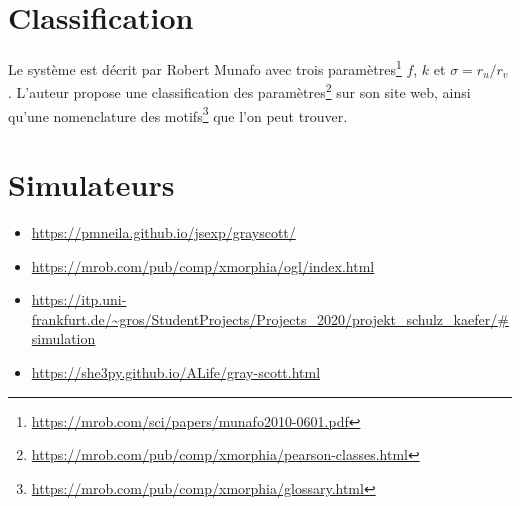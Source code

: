 \documentclass[11pt]{scrartcl}
\begin{document}
    \section{Classification}\label{sec:classification}

        Le système est décrit par Robert Munafo avec trois paramètres\footnote{\url{https://mrob.com/sci/papers/munafo2010-0601.pdf}}
        $f$, $k$ et $\sigma = r_u / r_v$.
        L'auteur propose une classification des paramètres\footnote{\url{https://mrob.com/pub/comp/xmorphia/pearson-classes.html}}
        sur son site web, ainsi qu'une nomenclature des motifs\footnote{\url{https://mrob.com/pub/comp/xmorphia/glossary.html}} que l'on
        peut trouver.

    \section{Simulateurs}\label{sec:simulateurs}

        \begin{itemize}
            \item \url{https://pmneila.github.io/jsexp/grayscott/}
            \item \url{https://mrob.com/pub/comp/xmorphia/ogl/index.html}
            \item \url{https://itp.uni-frankfurt.de/~gros/StudentProjects/Projects_2020/projekt_schulz_kaefer/#simulation}
            \item \url{https://she3py.github.io/ALife/gray-scott.html}
        \end{itemize}
\end{document}
